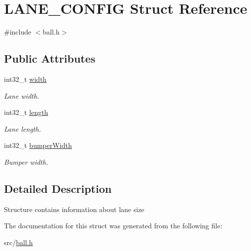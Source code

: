 \hypertarget{structLANE__CONFIG}{\section{L\-A\-N\-E\-\_\-\-C\-O\-N\-F\-I\-G Struct Reference}
\label{structLANE__CONFIG}
}


{\ttfamily \#include $<$ball.\-h$>$}

\subsection*{Public Attributes}
\begin{DoxyCompactItemize}
\item 
\hypertarget{structLANE__CONFIG_a34329893b74eda97372a747e3838b2ec}{int32\-\_\-t \hyperlink{structLANE__CONFIG_a34329893b74eda97372a747e3838b2ec}{width}}\label{structLANE__CONFIG_a34329893b74eda97372a747e3838b2ec}

\begin{DoxyCompactList}\small\item\em Lane width. \end{DoxyCompactList}\item 
\hypertarget{structLANE__CONFIG_acf00610e7fecb41f1edc61515d7643e2}{int32\-\_\-t \hyperlink{structLANE__CONFIG_acf00610e7fecb41f1edc61515d7643e2}{length}}\label{structLANE__CONFIG_acf00610e7fecb41f1edc61515d7643e2}

\begin{DoxyCompactList}\small\item\em Lane length. \end{DoxyCompactList}\item 
\hypertarget{structLANE__CONFIG_ac8784d0ba57e25d40e21c7ded06b4d77}{int32\-\_\-t \hyperlink{structLANE__CONFIG_ac8784d0ba57e25d40e21c7ded06b4d77}{bumper\-Width}}\label{structLANE__CONFIG_ac8784d0ba57e25d40e21c7ded06b4d77}

\begin{DoxyCompactList}\small\item\em Bumper width. \end{DoxyCompactList}\end{DoxyCompactItemize}


\subsection{Detailed Description}
Structure contains information about lane size 

The documentation for this struct was generated from the following file\-:\begin{DoxyCompactItemize}
\item 
src/\hyperlink{ball_8h}{ball.\-h}\end{DoxyCompactItemize}
